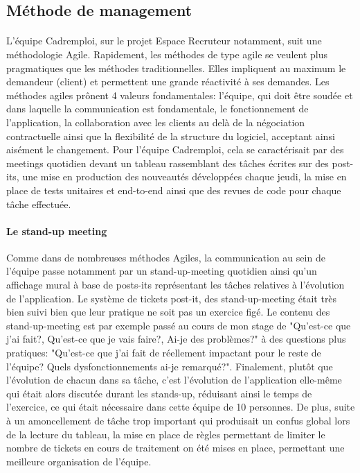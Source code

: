 \subsection{Méthode de management}
\label{sub:Méthode de management}
\paragraph{}
L'équipe Cadremploi, sur le projet Espace Recruteur notamment, suit une méthodologie Agile.
Rapidement, les méthodes de type agile se veulent plus pragmatiques que les méthodes traditionnelles.
Elles impliquent au maximum le demandeur (client) et permettent une grande réactivité à ses demandes.
Les méthodes agiles prônent 4 valeurs fondamentales: l'équipe, qui doit être soudée et dans laquelle la communication est fondamentale, le fonctionnement de l'application, la collaboration avec les clients au delà de la négociation contractuelle ainsi que la flexibilité de la structure du logiciel, acceptant ainsi aisément le changement.
Pour l'équipe Cadremploi, cela se caractérisait par des meetings quotidien devant un tableau rassemblant des tâches écrites sur des post-its, une mise en production des nouveautés développées chaque jeudi, la mise en place de tests unitaires et end-to-end ainsi que des revues de code pour chaque tâche effectuée.
\paragraph{Le stand-up meeting}
Comme dans de nombreuses méthodes Agiles, la communication au sein de l'équipe passe notamment par un stand-up-meeting quotidien ainsi qu'un affichage mural à base de posts-its représentant les tâches relatives à l'évolution de l'application.
Le système de tickets post-it, des stand-up-meeting était très bien suivi bien que leur pratique ne soit pas un exercice figé.
Le contenu des stand-up-meeting est par exemple passé au cours de mon stage de "Qu'est-ce que j'ai fait?, Qu'est-ce que je vais faire?, Ai-je des problèmes?" à des questions plus pratiques: "Qu'est-ce que j'ai fait de réellement impactant pour le reste de l'équipe? Quels dysfonctionnements ai-je remarqué?".
Finalement, plutôt que l'évolution de chacun dans sa tâche, c'est l'évolution de l'application elle-même qui était alors discutée durant les stands-up, réduisant ainsi le temps de l'exercice, ce qui était nécessaire dans cette équipe de 10 personnes.
De plus, suite à un amoncellement de tâche trop important qui produisait un confus global lors de la lecture du tableau, la mise en place de règles permettant de limiter le nombre de tickets en cours de traitement on été mises en place, permettant une meilleure organisation de l'équipe.
